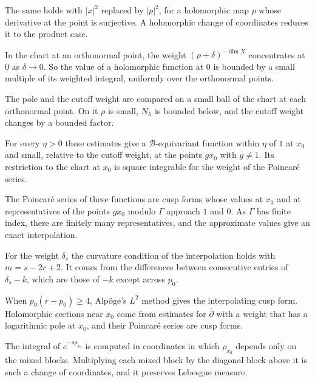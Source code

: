 The same holds with $|x|^2$ replaced by $|p|^2$, for a holomorphic map $p$ whose derivative at the point
is surjective. A holomorphic change of coordinates reduces it to the product case.

In the chart at an orthonormal point, the weight $(\rho+\delta)^{-\dim X}$ concentrates at $0$ as
$\delta\to0$. So the value of a holomorphic function at $0$ is bounded by a small multiple of its weighted
integral, uniformly over the orthonormal points.

The pole and the cutoff weight are compared on a small ball of the chart at each orthonormal point. On it
$\rho$ is small, $N_\lambda$ is bounded below, and the cutoff weight changes by a bounded factor.

For every $\eta>0$ these estimates give a $\mathcal B$-equivariant function within $\eta$ of $1$ at $x_0$
and small, relative to the cutoff weight, at the points $gx_0$ with $g\ne1$. Its restriction to the chart
at $x_0$ is square integrable for the weight of the Poincaré series.

The Poincaré series of these functions are cusp forms whose values at $x_0$ and at representatives of the
points $gx_0$ modulo $\Gamma$ approach $1$ and $0$. As $\Gamma$ has finite index, there are finitely many
representatives, and the approximate values give an exact interpolation.

For the weight $\delta_s$ the curvature condition of the interpolation holds with $m=s-2r+2$. It comes
from the differences between consecutive entries of $\delta_s-k$, which are those of $-k$ except across
$p_0$.

When $p_0(r-p_0)\geq4$, Alpöge's $L^2$ method gives the interpolating cusp form. Holomorphic sections near
$x_0$ come from estimates for $\bar\partial$ with a weight that has a logarithmic pole at $x_0$, and their
Poincaré series are cusp forms.

The integral of $e^{-s\rho_{x_0}}$ is computed in coordinates in which $\rho_{x_0}$ depends only on the mixed
blocks. Multiplying each mixed block by the diagonal block above it is such a change of coordinates, and it
preserves Lebesgue measure.

